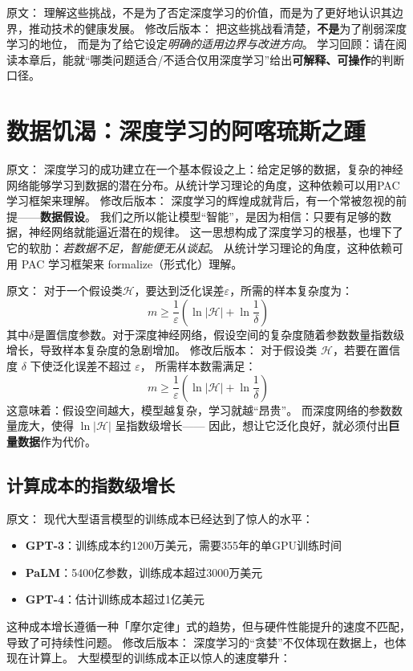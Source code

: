 原文：
理解这些挑战，不是为了否定深度学习的价值，而是为了更好地认识其边界，推动技术的健康发展。
修改后版本：
把这些挑战看清楚，\textbf{不是}为了削弱深度学习的地位，  
而是为了给它设定\textit{明确的适用边界与改进方向}。  
学习回顾：请在阅读本章后，能就“哪类问题适合/不适合仅用深度学习”给出\textbf{可解释、可操作}的判断口径。

\section{数据饥渴：深度学习的阿喀琉斯之踵}

原文：
深度学习的成功建立在一个基本假设之上：给定足够的数据，复杂的神经网络能够学习到数据的潜在分布。从统计学习理论的角度，这种依赖可以用PAC学习框架来理解。
修改后版本：
深度学习的辉煌成就背后，有一个常被忽视的前提——\textbf{数据假设}。  
我们之所以能让模型“智能”，是因为相信：只要有足够的数据，神经网络就能逼近潜在的规律。  
这一思想构成了深度学习的根基，也埋下了它的软肋：\textit{若数据不足，智能便无从谈起}。  
从统计学习理论的角度，这种依赖可用 PAC 学习框架来 formalize（形式化）理解。

原文：
对于一个假设类$\mathcal{H}$，要达到泛化误差$\varepsilon$，所需的样本复杂度为：
$$m \geq \frac{1}{\varepsilon}\left(\ln|\mathcal{H}| + \ln\frac{1}{\delta}\right)$$
其中$\delta$是置信度参数。对于深度神经网络，假设空间的复杂度随着参数数量指数级增长，导致样本复杂度的急剧增加。
修改后版本：
对于假设类 $\mathcal{H}$，若要在置信度 $\delta$ 下使泛化误差不超过 $\varepsilon$，  
所需样本数需满足：
$$m \geq \frac{1}{\varepsilon}\left(\ln|\mathcal{H}| + \ln\frac{1}{\delta}\right)$$  
这意味着：假设空间越大，模型越复杂，学习就越“昂贵”。  
而深度网络的参数数量庞大，使得 $\ln|\mathcal{H}|$ 呈指数级增长——  
因此，想让它泛化良好，就必须付出\textbf{巨量数据}作为代价。



\subsection{计算成本的指数级增长}

原文：
现代大型语言模型的训练成本已经达到了惊人的水平：
\begin{itemize}
\item \textbf{GPT-3}：训练成本约1200万美元，需要355年的单GPU训练时间
\item \textbf{PaLM}：5400亿参数，训练成本超过3000万美元
\item \textbf{GPT-4}：估计训练成本超过1亿美元
\end{itemize}
这种成本增长遵循一种「摩尔定律」式的趋势，但与硬件性能提升的速度不匹配，导致了可持续性问题。
修改后版本：
深度学习的“贪婪”不仅体现在数据上，也体现在计算上。  
大型模型的训练成本正以惊人的速度攀升：  

